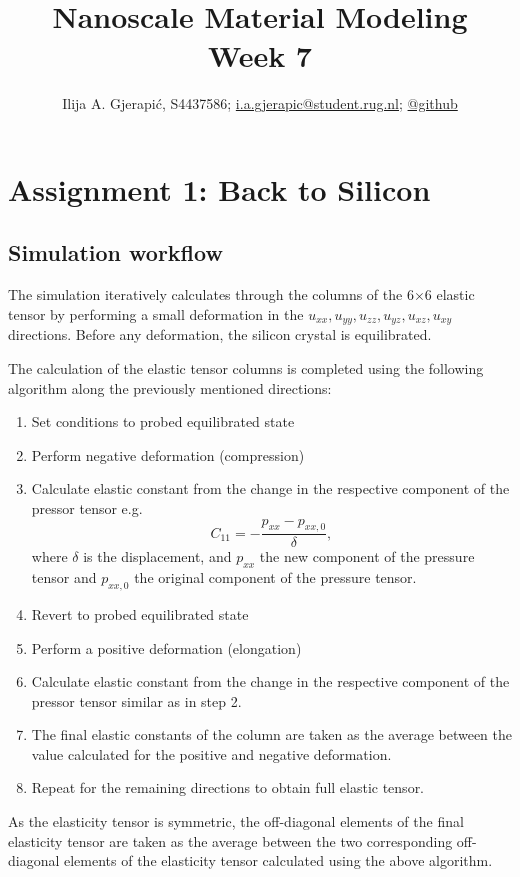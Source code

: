\documentclass[10pt,a4paper]{labreport}
\title{Nanoscale Material Modeling
\\
\normalsize{Week 7}} %
\author{Ilija A. Gjerapić, S4437586; \href{mailto:i.a.gjerapic@student.rug.nl}{i.a.gjerapic@student.rug.nl}; \href{https://github.com/igjerapic/nmm-week7/}{@github} } %
\begin{document}
\maketitle
\tableofcontents


  

\thispagestyle{firststyle}
\newpage
\section{Assignment 1: Back to Silicon}

\subsection{Simulation workflow}
The simulation iteratively calculates through the columns of the 6$\times$6 elastic tensor by performing a small deformation in the $u_{xx},u_{yy},u_{zz},u_{yz},u_{xz}, u_{xy}$ directions. 
Before any deformation, the silicon crystal is equilibrated.  

The calculation of the  elastic tensor columns is completed using the following algorithm along the previously mentioned directions:
\begin{enumerate}
  \item Set conditions to probed equilibrated state
  \item Perform negative deformation (compression)
  \item Calculate elastic constant from the change in the respective component of the pressor tensor e.g.
  $$ C_{11} = -\frac{p_{xx} - p_{xx,0}}{\delta},$$
  where $\delta$ is the displacement, and $p_{xx}$ the new component of the pressure tensor and $p_{xx,0}$ the original component of the pressure tensor.  
  \item Revert to probed equilibrated state
  \item Perform a positive deformation (elongation)
  \item Calculate elastic constant from the change in the respective component of the pressor tensor similar as in step 2.
  \item The final elastic constants of the column are taken as the average between the value calculated for the positive and negative deformation. 
  \item Repeat for the remaining directions to obtain full elastic tensor. 
\end{enumerate} 
As the elasticity tensor is symmetric, the off-diagonal elements of the final elasticity tensor are taken as the average between the two corresponding off-diagonal elements of the elasticity tensor calculated using the above algorithm.   
\end{document}

